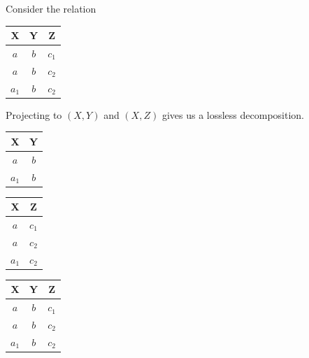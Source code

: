   \begin{example}
    Consider the relation 
    \begin{table}[H]
      \centering
      \begin{tabular}{|c|c|c|}
        \hline
        \textbf{X} & \textbf{Y} & \textbf{Z} \\
        \hline
        $a$ & $b$ & $c_1$ \\
        $a$ & $b$ & $c_2$ \\
        $a_1$ & $b$ & $c_2$ \\
        \hline
      \end{tabular}
      \label{tab:ex5}
    \end{table}
    Projecting to $(X, Y)$ and $(X, Z)$ gives us a lossless decomposition. 
    \begin{table}[H]
      \centering
      \begin{minipage}{.32\textwidth}
        \centering
        \begin{tabular}{|c|c|}
          \hline
          \textbf{X} & \textbf{Y} \\
          \hline
          $a$ & $b$ \\
          $a_1$ & $b$ \\
          \hline
        \end{tabular}
        \label{tab:ex6}
      \end{minipage}
      \begin{minipage}{.32\textwidth}
        \centering
        \begin{tabular}{|c|c|}
          \hline
          \textbf{X} & \textbf{Z} \\
          \hline
          $a$ & $c_1$ \\
          $a$ & $c_2$ \\
          $a_1$ & $c_2$ \\
          \hline
        \end{tabular}
        \label{tab:ex7}
      \end{minipage}
      \begin{minipage}{.32\textwidth}
        \centering
        \begin{tabular}{|c|c|c|}
          \hline
          \textbf{X} & \textbf{Y} & \textbf{Z}\\
          \hline
          $a$ & $b$ & $c_1$ \\
          $a$ & $b$ & $c_2$ \\
          $a_1$ & $b$ & $c_2$ \\

\end{tabular}
\end{minipage}
\end{table}
\end{example}
